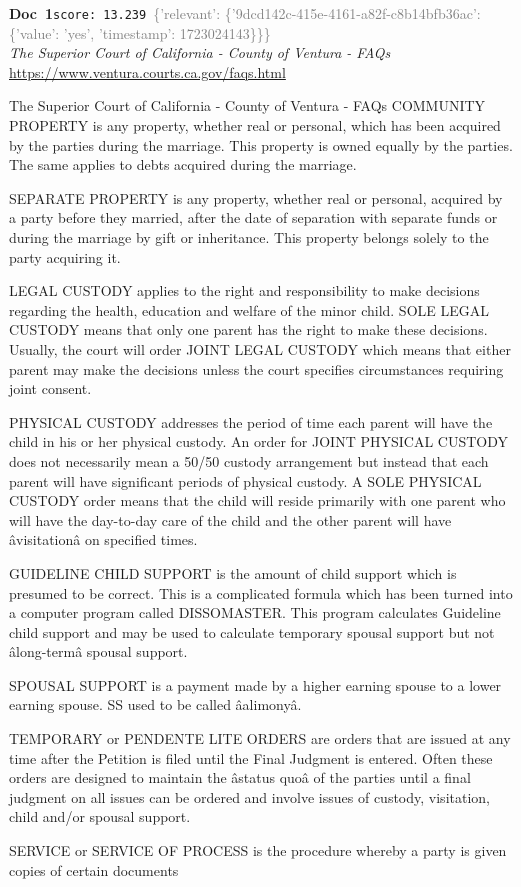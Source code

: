 \documentclass[a4paper,11pt]{article}
\begin{document}
\begin{docenv}
{\footnotesize\textcolor{doccolor}{\textbf{Doc~1}}}\hfill{\tiny\texttt{score:~13.239}}\ {\tiny\textcolor{gray}{\{'relevant': \{'9dcd142c-415e-4161-a82f-c8b14bfb36ac': \{'value': 'yes', 'timestamp': 1723024143\}\}\}}}\\[3pt]
{\small\textit{The Superior Court of California - County of Ventura - FAQs}}\\[2pt]
{\tiny\url{https://www.ventura.courts.ca.gov/faqs.html}}\\[4pt]
{\footnotesize The Superior Court of California - County of Ventura - FAQs
COMMUNITY PROPERTY is any property, whether real or personal, which has been acquired by the parties during 
 the marriage. This property is owned equally by the parties. The same applies to debts acquired during the marriage.

SEPARATE PROPERTY is any property, whether real or personal, acquired by a party before they married, after 
 the date of separation with separate funds or during the marriage by gift or inheritance. This property belongs solely to the party acquiring it.

LEGAL CUSTODY applies to the right and responsibility to make decisions regarding the health, education and 
 welfare of the minor child. SOLE LEGAL CUSTODY means that only one parent has the right to make these decisions. 
 Usually, the court will order JOINT LEGAL CUSTODY which means that either parent may make the decisions unless 
 the court specifies circumstances requiring joint consent.

PHYSICAL CUSTODY addresses the period of time each parent will have the child in his or her physical custody. 
 An order for JOINT PHYSICAL CUSTODY does not necessarily mean a 50/50 custody arrangement but instead that each 
 parent will have significant periods of physical custody. A SOLE PHYSICAL CUSTODY order means that the child will 
 reside primarily with one parent who will have the day-to-day care of the child and the other parent will have âvisitationâ on specified times.

GUIDELINE CHILD SUPPORT is the amount of child support which is presumed to be correct. This is a complicated 
 formula which has been turned into a computer program called DISSOMASTER. This program calculates Guideline child 
 support and may be used to calculate temporary spousal support but not âlong-termâ spousal support.

SPOUSAL SUPPORT is a payment made by a higher earning spouse to a lower earning spouse. SS used to be called âalimonyâ.

TEMPORARY or PENDENTE LITE ORDERS are orders that are issued at any time after the Petition is 
 filed until the Final Judgment is entered. Often these orders are designed to maintain the âstatus quoâ of the parties until a final 
 judgment on all issues can be ordered and involve issues of custody, visitation, child and/or spousal support.

SERVICE or SERVICE OF PROCESS is the procedure whereby a party is given copies of certain documents}
\end{docenv}
\end{document}
